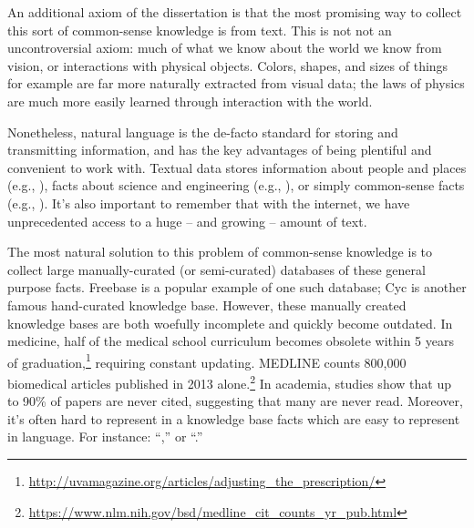 An additional axiom of the dissertation is that the most promising way to collect this sort of 
  common-sense knowledge is from text.
This is not not an uncontroversial axiom: much of what we know about the world we know from
  vision, or interactions with physical objects.
Colors, shapes, and sizes of things for example are far more naturally extracted from visual data;
  the laws of physics are much more easily learned through interaction with the world.

Nonetheless, natural language is the de-facto standard for storing and transmitting 
  information, and has the key advantages of being plentiful and convenient to work with.
Textual data stores information about people and places (e.g., ), facts about science and engineering (e.g., ), 
  or simply common-sense facts (e.g., ). 
It's also important to remember that with the internet, we have unprecedented access to a 
  huge -- and growing -- amount of text.

The most natural solution to this problem of common-sense knowledge is to collect large 
  manually-curated (or semi-curated) databases of these general purpose facts.
Freebase \cite{key:2008bollacker-freebase} is a popular example of one
  such database; Cyc \cite{key:1995lenat-cyc} is another famous hand-curated
  knowledge base.
However, these manually created knowledge bases are both woefully incomplete 
  and quickly become outdated.
In medicine, half of the medical school curriculum becomes obsolete within 5 
  years of graduation,\footnote{
    \url{http://uvamagazine.org/articles/adjusting\_the\_prescription/}
  }
  requiring constant updating.
  MEDLINE counts 800,000 biomedical articles published in 2013 alone.\footnote{
    \url{https://www.nlm.nih.gov/bsd/medline\_cit\_counts\_yr\_pub.html}
  }
In academia, studies show that up to 90\% of papers are never 
  cited, suggesting that many are never read.
Moreover, it's often hard to represent in a knowledge base facts which are easy to 
  represent in language.
For instance: ``,'' or ``.''

